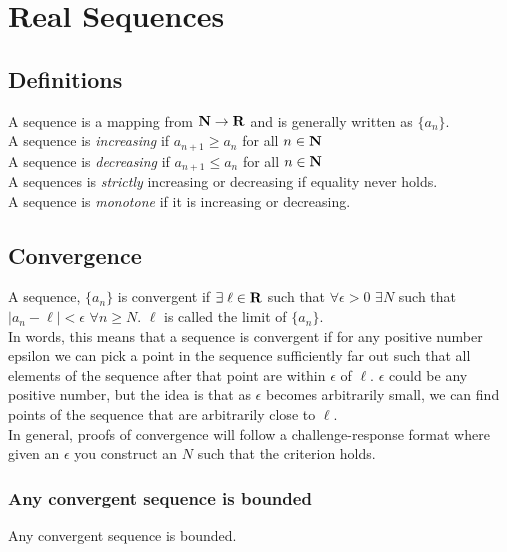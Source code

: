 \section{Real Sequences}
  \subsection{Definitions}
    A sequence is a mapping from $\mathbf{N} \to \mathbf{R}$ and is generally written as $\{a_n\}$.\\

    A sequence is \emph{increasing} if $a_{n+1} \geq a_n$ for all $n \in \mathbf{N}$\\
    A sequence is \emph{decreasing} if $a_{n+1} \leq a_n$ for all $n \in \mathbf{N}$\\
    A sequences is \emph{strictly} increasing or decreasing if equality never holds.\\
    A sequence is \emph{monotone} if it is increasing or decreasing.\\

  \subsection{Convergence}
    A sequence, $\{a_n\}$ is convergent if $\exists\;\ell \in \mathbf{R}$ such that $\forall \epsilon 
    > 0$ $\exists N$ such that $|a_n - \ell| < \epsilon$ $\forall n \geq N$. $\ell$ is called the
    limit of $\{a_n\}$.\\
    
    In words, this means that a sequence is convergent if for any positive number epsilon we can
    pick a point in the sequence sufficiently far out such that all elements of the sequence 
    after that point are within $\epsilon$ of $\ell$. $\epsilon$ could be any positive number, 
    but the idea is that as $\epsilon$ becomes arbitrarily small, we can find points of the 
    sequence that are arbitrarily close to $\ell$.\\

    In general, proofs of convergence will follow a challenge-response format where given an 
    $\epsilon$ you construct an $N$ such that the criterion holds.\\

  \subsubsection{Any convergent sequence is bounded}
    \thm Any convergent sequence is bounded.\\

